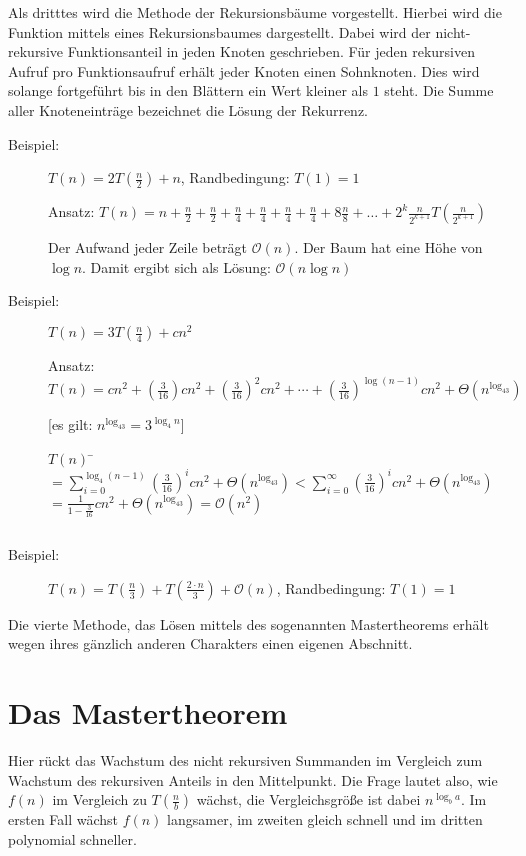 \documentclass[ngerman,draft,parskip=half*,twoside]{scrreprt}
\theoremstyle{break}
\theoremstyle{nonumberbreak}
\newcommand*{\OO}{\mathcal{O}}      %
\begin{document}
Als dritttes wird die Methode der Rekursionsbäume vorgestellt.
Hierbei wird die Funktion mittels eines Rekursionsbaumes dargestellt. Dabei wird der nicht-rekursive Funktionsanteil in jeden Knoten
geschrieben. Für jeden rekursiven Aufruf pro Funktionsaufruf erhält jeder Knoten einen Sohnknoten. Dies wird solange fortgeführt bis
in den Blättern ein Wert kleiner als $1$ steht. Die Summe aller Knoteneinträge bezeichnet die Lösung der Rekurrenz.
	\begin{description}
		\item [Beispiel:] $T(n) = 2 T(\frac{n}{2}) + n$, Randbedingung: $T(1)=1$
			
		Ansatz: $T(n) = n + \frac{n}{2} + \frac{n}{2} + \frac{n}{4} + \frac{n}{4} + \frac{n}{4} + \frac{n}{4} + 8 \frac{n}{8} + 
		\ldots + {2^k} \frac{n}{2^{k+1}} T(\frac{n}{2^{k+1}})$
			
		
			
		Der Aufwand jeder Zeile beträgt $\OO(n)$. Der Baum hat eine Höhe von $\log n$. Damit ergibt sich als Lösung: 
		$\OO(n \log n)$			
		
		\item [Beispiel:] $T(n) = 3 T(\frac{n}{4}) + c n^2$
						
		Ansatz: $T(n) = c n^2 + (\frac{3}{16} ) c n^2 + (\frac{3}{16})^2 c n^2 + \cdots +
		(\frac{3}{16})^{\log (n-1)} c n^2 + \Theta(n^{\log_43})$
			
		[es gilt: $n^{\log_43}=3^{\log_4n}$]
			\begin{tabbing}
				$T(n)$ \= $= \sum_{i=0}^{\log_4(n-1)}(\frac{3}{16})^i c n^2+ \Theta(n^{\log_43}) 
				< \sum_{i=0}^{\infty}(\frac{3}{16})^i c n^2 + \Theta(n^{\log_43})$\\
				\> $= \frac{1}{1-\frac{3}{16}} c n^2 + \Theta(n^{\log_43})=\OO(n^2)$
			\end{tabbing}			
		$  $
	\end{description}
		
\begin{description}
	\item [Beispiel:] $T(n) = T(\frac{n}{3}) + T(\frac{2\cdot n}{3}) + \OO(n)$, Randbedingung: $T(1)=1$
	$  $
	\end{description}		
%
Die vierte Methode, das Lösen mittels des sogenannten Mastertheorems erhält wegen ihres gänzlich anderen Charakters einen eigenen
Abschnitt.
%
\section{Das Mastertheorem}
\label{sec:mastertheorem}
Hier rückt das Wachstum des nicht rekursiven Summanden im Vergleich
zum Wachstum des rekursiven Anteils in den Mittelpunkt. Die Frage
lautet also, wie $f(n)$ im Vergleich zu $T(\frac{n}{b})$ wächst, die
Vergleichsgröße ist dabei $n^{\log_b a}$.  Im ersten Fall wächst
$f(n)$ langsamer, im zweiten gleich schnell und im dritten polynomial
schneller.
\end{document}
